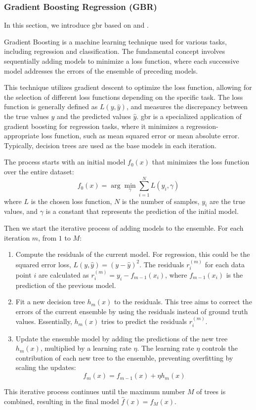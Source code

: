 \subsubsection{Gradient Boosting Regression (GBR)}\label{sec:gradientboost}
In this section, we introduce \gls{gbr} based on \citet{hastie_elements} and \citet{burkovHundredpageMachineLearning2023}.

Gradient Boosting is a machine learning technique used for various tasks, including regression and classification.
The fundamental concept involves sequentially adding models to minimize a loss function, where each successive model addresses the errors of the ensemble of preceding models.

This technique utilizes gradient descent to optimize the loss function, allowing for the selection of different loss functions depending on the specific task.
The loss function is generally defined as $L(y,\hat{y})$, and measures the discrepancy between the true values $y$ and the predicted values $\hat{y}$.
\gls{gbr} is a specialized application of gradient boosting for regression tasks, where it minimizes a regression-appropriate loss function, such as mean squared error or mean absolute error.
Typically, decision trees are used as the base models in each iteration.

The process starts with an initial model $f_{0}(x)$ that minimizes the loss function over the entire dataset:
$$
f_{0}(x)=\arg\min_{\gamma}\sum^{N}_{i=1}L(y_{i},\gamma)
$$
where $L$ is the chosen loss function, $N$ is the number of samples, $y_{i}$ are the true values, and $\gamma$ is a constant that represents the prediction of the initial model.

Then we start the iterative process of adding models to the ensemble.
For each iteration $m$, from $1$ to $M$:

\begin{enumerate}
    \item Compute the residuals of the current model. For regression, this could be the squared error loss, $L(y, \hat{y}) = (y - \hat{y})^2$. The residuals $r_{i}^{(m)}$ for each data point $i$ are calculated as $r_{i}^{(m)} = y_{i} - f_{m-1}(x_{i})$, where $f_{m-1}(x_{i})$ is the prediction of the previous model.
    \item Fit a new decision tree $h_{m}(x)$ to the residuals. This tree aims to correct the errors of the current ensemble by using the residuals instead of ground truth values. Essentially, $h_{m}(x)$ tries to predict the residuals $r_{i}^{(m)}$.
    \item Update the ensemble model by adding the predictions of the new tree $h_{m}(x)$, multiplied by a learning rate $\eta$. The learning rate $\eta$ controls the contribution of each new tree to the ensemble, preventing overfitting by scaling the updates:
    $$
    f_{m}(x)=f_{m-1}(x)+\eta h_{m}(x)
    $$
\end{enumerate}

This iterative process continues until the maximum number $M$ of trees is combined, resulting in the final model $\hat{f}(x) = f_{M}(x)$.